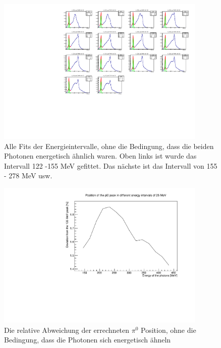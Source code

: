 \documentclass[a4paper,11pt,oneside,final,german,openbib,pdftex]{scrbook}
\begin{document}
\begin{appendix}
\begin{figure}[h!]
	\begin{center}
		\includegraphics[width=100mm]{allfitsallenergy1303}
		\caption{Alle Fits der Energieintervalle, ohne die Bedingung, dass die beiden Photonen energetisch ähnlich waren. Oben links ist wurde das Intervall 122 -155 MeV gefittet. Das nächste ist das Intervall von 155 - 278 MeV usw.}
		\label{fig:allenergyallfits}
	\end{center}
\end{figure}

\begin{figure}
	\begin{center}
		\includegraphics[width=100mm]{allenergyrelativedeviation1303}
		\caption{Die relative Abweichung der errechneten $\pi^0$ Position, ohne die Bedingung, dass die Photonen sich energetisch ähneln}
		\label{fig:Relative-Deviation-Energy-Interval-No-Condition}
	\end{center}
\end{figure}


\end{appendix}
\end{document}
